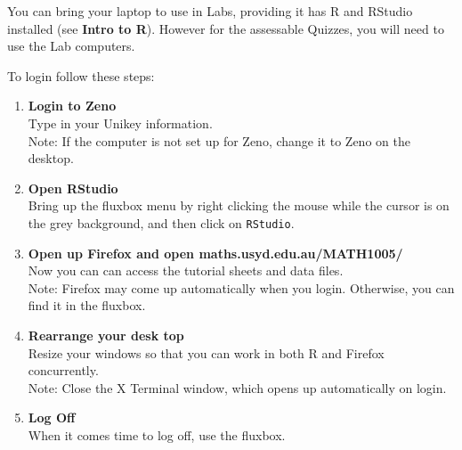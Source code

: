 \documentclass[bigtut]{tutorial}\usepackage[]{graphicx}\usepackage[]{color}
\begin{document}

\begin{tutorial}

You can bring your laptop to use in Labs, providing it has R and RStudio installed (see {\bf Intro to R}). However for the assessable Quizzes, you will need to use the Lab computers.

\vspace{.5cm}
To login follow these steps:

\begin{enumerate}
\item {\bf Login to Zeno}  \\
Type in your Unikey information.  \\
Note: If the computer is not set up for Zeno, change it to Zeno on the desktop. \\

\item {\bf Open RStudio} \\
Bring up the fluxbox menu by right clicking the mouse while the cursor is on the grey background, and then click on \texttt{RStudio}. \\

\item {\bf Open up Firefox and open  maths.usyd.edu.au/MATH1005/} \\
Now you can can access the tutorial sheets and data files. \\
Note: Firefox may come up automatically when you login. Otherwise, you can find it in the fluxbox. \\

\item {\bf Rearrange your desk top} \\
Resize your windows so that you can work in both R and Firefox concurrently. \\
Note: Close the X Terminal window, which opens up automatically on login. \\

\item {\bf Log Off} \\
When it comes time to log off, use the fluxbox.

\end{enumerate}





\end{tutorial}
\end{document}
